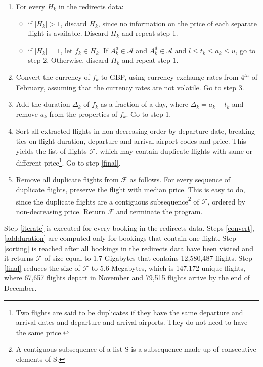 \documentclass{mpaper}
\begin{document}
\begin{enumerate}[topsep=0.1em]
\setlength\itemsep{0.1em}
\item \label{iterate} For every $H_k$ in the redirects data:
\begin{itemize}[topsep=0.1em]
\setlength\itemsep{0.1em}
\item if $|H_k| > 1$, discard $H_k$, since no information on the price of each separate flight is available. Discard $H_k$ and repeat step 1.
\item if $|H_k| = 1$, let $f_k \in H_k$. If $A^{a}_{k} \in \mathcal{A}$ and $A^{d}_{k} \in \mathcal{A}$ and $l \leq t_k \leq a_k \leq u$, go to step 2. Otherwise, discard $H_k$ and repeat step 1.
\end{itemize}
\item \label{convert} Convert the currency of $f_k$ to GBP, using currency exchange rates from 4$^{th}$ of February, assuming that the currency rates are not volatile. Go to step 3.

\item \label{addduration} Add the duration $\Delta_k$ of $f_k$ as a fraction of a day, where $\Delta_k = a_k - t_k$ and remove $a_k$ from the properties of $f_k$. Go to step 1.

\item \label{sorting} Sort all extracted flights in non-decreasing order by departure date, breaking ties on flight duration, departure and arrival airport codes and price. This yields the list of flights $\mathcal{F}$, which may contain duplicate flights with same or different price\footnote{Two flights are said to be duplicates if they have the same departure and arrival dates and departure and arrival airports. They do not need to have the same price.}. Go to step \ref{final}.

\item \label{final} Remove all duplicate flights from $\mathcal{F}$ as follows. For every sequence of duplicate flights, preserve the flight with median price. This is easy to do, since the duplicate flights are a contiguous subsequence\footnote{A contiguous subsequence of a list S is a subsequence made up of consecutive elements of S.} of $\mathcal{F}$, ordered by non-decreasing price. Return $\mathcal{F}$ and terminate the program.

\end{enumerate}

Step \ref{iterate} is executed for every booking in the redirects data. Steps \ref{convert}, \ref{addduration} are computed only for bookings that contain one flight. Step \ref{sorting} is reached after all bookings in the redirects data have been visited and it returns $\mathcal{F}$ of size equal to 1.7 Gigabytes that contains 12,580,487 flights. Step \ref{final} reduces the size of $\mathcal{F}$ to 5.6 Megabytes, which is 147,172 unique flights, where 67,657 flights depart in November and 79,515 flights arrive by the end of December.
\end{document}
